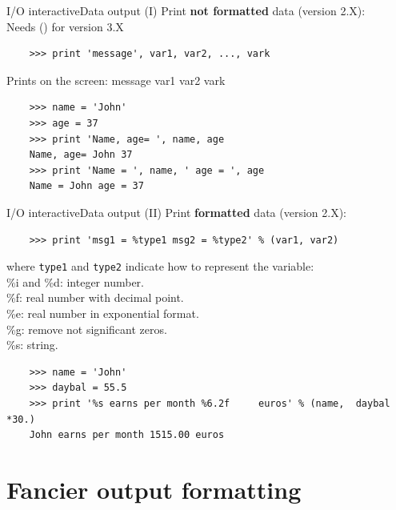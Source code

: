 \documentclass[10pt,compress]{beamer} %
\begin{document}
\begin{frame}[fragile]{I/O interactive}{Data output (I)}
Print \textbf{not formatted} data (version 2.X):\\
Needs () for version 3.X
\begin{verbatim}
	>>> print 'message', var1, var2, ..., vark
\end{verbatim}
Prints on the screen: \alert{message var1 var2 vark}
\begin{verbatim}
	>>> name = 'John'
	>>> age = 37
	>>> print 'Name, age= ', name, age
	Name, age= John 37
	>>> print 'Name = ', name, ' age = ', age
	Name = John age = 37
\end{verbatim}
\end{frame}

\begin{frame}[fragile]{I/O interactive}{Data output (II)}
Print \textbf{formatted} data (version 2.X):
\begin{verbatim}
	>>> print 'msg1 = %type1 msg2 = %type2' % (var1, var2)
\end{verbatim}
where \texttt{type1} and   \texttt{type2} indicate how to represent the variable:\\	
\hspace{0.5cm}\%i and \%d: integer number.\\
\hspace{0.5cm}\%f: real number with decimal point.\\
\hspace{0.5cm}\%e: real number in exponential format.\\
\hspace{0.5cm}\%g: remove not significant zeros.\\
\hspace{0.5cm}\%s: string.\\
\footnotesize{\begin{verbatim}
	>>> name = 'John'
	>>> daybal = 55.5
	>>> print '%s earns per month %6.2f 	euros' % (name,  daybal *30.)
    John earns per month 1515.00 euros
\end{verbatim}
}
\end{frame}



\section{Fancier output formatting}
\end{document}
